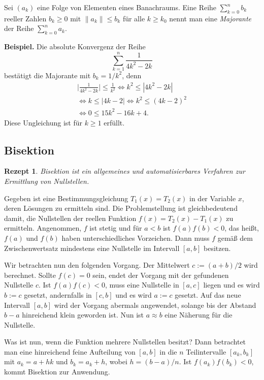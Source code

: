 \documentclass[a4paper,10pt,fleqn,twocolumn,twoside,dvipdfmx]{scrartcl}
\theoremstyle{rmbox}
\newtheorem{Rezept}{Rezept}[section]
\newcommand{\strong}[1]{\textsf{\textbf{#1}}}
\begin{document}
\noindent
Sei $(a_k)$ eine Folge von Elementen eines Banachraums.
Eine Reihe $\sum_{k=0}^n b_k$ reeller Zahlen $b_k\ge 0$ mit
$\|a_k\|\le b_k$ für alle $k\ge k_0$ nennt man eine \emph{Majorante}
der Reihe $\sum_{k=0}^n a_k$.

\strong{Beispiel.} Die absolute Konvergenz der Reihe
\[\sum_{k=1}^n\frac{1}{4k^2-2k}\]
bestätigt die Majorante mit $b_k=1/k^2$, denn
\begin{gather*}
\Big|\frac{1}{4k^2-2k}\Big| \le \frac{1}{k^2}\iff k^2\le |4k^2-2k|\\
\iff k\le |4k-2| \iff k^2 \le (4k-2)^2\\
\iff 0\le 15k^2-16k+4.
\end{gather*}
Diese Ungleichung ist für $k\ge 1$ erfüllt.

\newpage
\subsection{Bisektion}

\begin{Rezept}
Bisektion ist ein allgemeines und automatisierbares
Verfahren zur Ermittlung von Nullstellen.
\end{Rezept}

\noindent
Gegeben ist eine Bestimmungsgleichung $T_1(x)=T_2(x)$ in der
Variable $x$, deren Lösungen zu ermitteln sind. Die Problemstellung
ist gleichbedeutend damit, die Nullstellen der reellen Funktion
$f(x)=T_2(x)-T_1(x)$ zu ermitteln. Angenommen, $f$ ist stetig
und für $a<b$ ist $f(a)f(b)<0$, das heißt, $f(a)$ und $f(b)$ haben
unterschiedliches Vorzeichen. Dann muss $f$ gemäß dem Zwischenwertsatz
mindestens eine Nullstelle im Intervall $[a,b]$ besitzen.

Wir betrachten nun den folgenden Vorgang. Der Mittelwert $c := (a+b)/2$
wird berechnet. Sollte $f(c)=0$ sein, endet der Vorgang mit der
gefundenen Nullstelle $c$. Ist $f(a)f(c)<0$, muss eine Nullstelle
in $[a,c]$ liegen und es wird $b:=c$ gesetzt, andernfalls in $[c,b]$
und es wird $a:=c$ gesetzt. Auf das neue Intervall $[a,b]$ wird der Vorgang
abermals angewendet, solange bis der Abstand $b-a$ hinreichend klein
geworden ist. Nun ist $a\approx b$ eine Näherung für die
Nullstelle.

Was ist nun, wenn die Funktion mehrere Nullstellen besitzt?
Dann betrachtet man eine hinreichend feine Aufteilung von $[a,b]$ in
die $n$ Teilintervalle $[a_k,b_k]$ mit $a_k=a+hk$ und $b_k=a_k+h$, wobei
$h=(b-a)/n$. Ist $f(a_k)f(b_k)<0$, kommt Bisektion zur
Anwendung.
\end{document}
